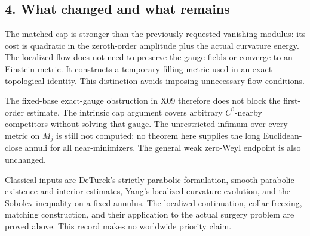 \documentclass[
  11pt,
]{article}
\begin{document}
\hypertarget{what-changed-and-what-remains}{%
\subsection{4. What changed and what
remains}\label{what-changed-and-what-remains}}

The matched cap is stronger than the previously requested vanishing
modulus: its cost is quadratic in the zeroth-order amplitude plus the
actual curvature energy. The localized flow does not need to preserve
the gauge fields or converge to an Einstein metric. It constructs a
temporary filling metric used in an exact topological identity. This
distinction avoids imposing unnecessary flow conditions.

The fixed-base exact-gauge obstruction in X09 therefore does not block
the first-order estimate. The intrinsic cap argument covers arbitrary
\(C^0\)-nearby competitors without solving that gauge. The unrestricted
infimum over every metric on \(M_j\) is still not computed: no theorem
here supplies the long Euclidean-close annuli for all near-minimizers.
The general weak zero-Weyl endpoint is also unchanged.

Classical inputs are DeTurck's strictly parabolic formulation, smooth
parabolic existence and interior estimates, Yang's localized curvature
evolution, and the Sobolev inequality on a fixed annulus. The localized
continuation, collar freezing, matching construction, and their
application to the actual surgery problem are proved above. This record
makes no worldwide priority claim.
\end{document}
